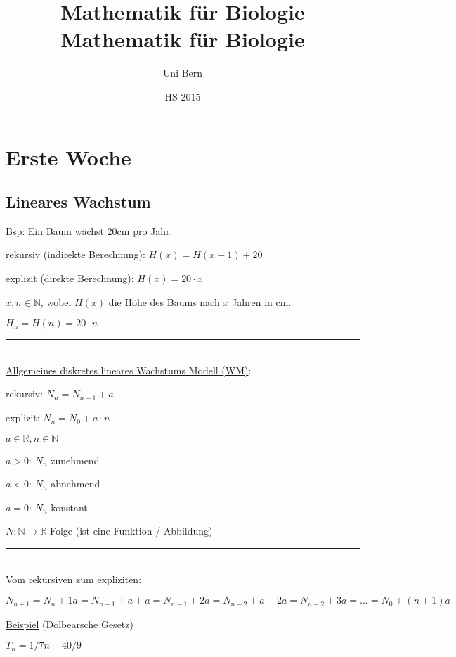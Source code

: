 \documentclass[18pt,a4paper]{scrreprt}
\title{Mathematik für Biologie}
\title{
	\vspace{5cm}
	Mathematik für Biologie \\
}
\author{Uni Bern}
\date{HS 2015}
\begin{document}
\maketitle
\thispagestyle{fancy}
\newpage

\tableofcontents	  	
\newpage



\chapter{Erste Woche}


\section{Lineares Wachstum}

\uline{Bsp}: Ein Baum wächst 20cm pro Jahr.

rekursiv (indirekte Berechnung): $H(x) = H(x-1) + 20$

explizit (direkte Berechnung): $H(x) = 20 \cdot x$

$x,n \in \mathbb{N}$, wobei $H(x)$ die Höhe des Baums nach $x$ Jahren in cm.

$H_n  = H(n) = 20 \cdot n$

\rule{\textwidth}{0.4mm}\\

\uline{Allgemeines diskretes lineares Wachstums Modell (WM)}:

rekursiv: $N_n = N_{n-1} + a$

explizit: $N_n = N_0 + a \cdot n$

$a \in \mathbb{R}, n \in \mathbb{N}$

$a > 0$: $N_n$ zunehmend 

$a < 0$: $N_n$ abnehmend

$a = 0$: $N_n$ konstant

$N: \mathbb{N} \rightarrow \mathbb{R}$ Folge (ist eine Funktion / Abbildung)

\rule{\textwidth}{0.4mm}\\

Vom rekursiven zum expliziten:

$N_{n+1} = N_n + 1a = N_{n-1} + a + a = N_{n-1} + 2a = N_{n-2} + a + 2a = N_{n-2} + 3a = ... = N_0 + (n + 1) a$

\uline{Beispiel} (Dolbearsche Gesetz)

$T_n = 1/7n + 40/9$
\end{document}
